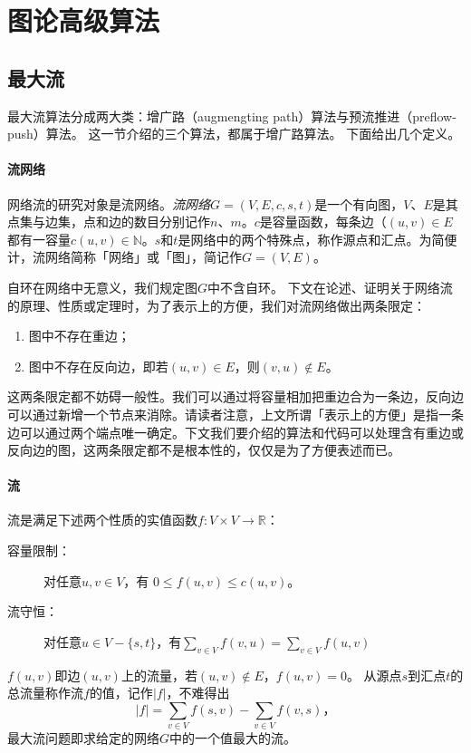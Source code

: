 \documentclass[fontset=ubuntu]{ctexbook}
\begin{document}
    \chapter{图论高级算法}
    \section{最大流}
    最大流算法分成两大类：增广路（augmengting path）算法与预流推进（preflow-push）算法。
    这一节介绍的三个算法，都属于增广路算法。
    下面给出几个定义。
    \subsubsection*{流网络}
    网络流的研究对象是流网络。\emph{流网络}$G=(V,E,c,s,t)$是一个有向图，$V$、$E$是其点集与边集，点和边的数目分别记作$n$、$m$。$c$是容量函数，每条边（$(u,v)\in E$都有一容量$c(u,v)\in \mathbb{N}$。$s$和$t$是网络中的两个特殊点，称作源点和汇点。为简便计，流网络简称「网络」或「图」，简记作$G=(V,E)$。

    自环在网络中无意义，我们规定图$G$中不含自环。%
    下文在论述、证明关于网络流的原理、性质或定理时，为了表示上的方便，我们对流网络做出两条限定：
    \begin{enumerate}
        \item 图中不存在重边；\label{Restrict:1}
        \item 图中不存在反向边，即若$(u,v)\in E$，则$(v,u)\notin E$。\label{Restrict:2}
    \end{enumerate}
    这两条限定都不妨碍一般性。我们可以通过将容量相加把重边合为一条边，反向边可以通过新增一个节点来消除。请读者注意，上文所谓「表示上的方便」是指一条边可以通过两个端点唯一确定。下文我们要介绍的算法和代码可以处理含有重边或反向边的图，这两条限定都不是根本性的，仅仅是为了方便表述而已。

    \subsubsection*{流}
    流是满足下述两个性质的实值函数$f\colon V\times V\to\mathbb{R}$：
    \begin{description}
        \item[容量限制：]对任意$u,v \in V$，有 $0\le f(u,v)\le c(u,v)$。
        \item[流守恒：]对任意$u\in V-\{s,t\}$，有$\sum\limits_{v\in V}f(v,u)= \sum\limits_{v\in V}f(u,v)$
    \end{description}
    $f(u,v)$即边$(u,v)$上的流量，若$(u,v)\notin E$，$f(u,v) = 0$。
    从源点$s$到汇点$t$的总流量称作流$f$的值，记作$|f|$，不难得出
    $$|f| = \sum_{v\in V}f(s,v) - \sum_{v\in V}f(v,s)\text{，}$$
    最大流问题即求给定的网络$G$中的一个值最大的流。
\end{document}
